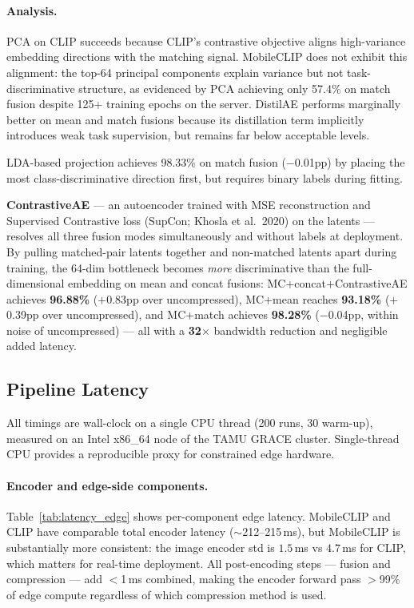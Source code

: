 \documentclass[10pt,twocolumn]{article}
\begin{document}
\paragraph{Analysis.}
PCA on CLIP succeeds because CLIP's contrastive objective aligns high-variance embedding
directions with the matching signal.
MobileCLIP does not exhibit this alignment: the top-64 principal components explain
variance but not task-discriminative structure, as evidenced by PCA achieving only
57.4\% on match fusion despite 125+ training epochs on the server.
DistilAE performs marginally better on mean and match fusions because its distillation
term implicitly introduces weak task supervision, but remains far below acceptable levels.

LDA-based projection achieves 98.33\% on match fusion ($-$0.01pp) by placing the
most class-discriminative direction first, but requires binary labels during fitting.

\textbf{ContrastiveAE} --- an autoencoder trained with MSE reconstruction and
Supervised Contrastive loss (SupCon; Khosla et al.\ 2020) on the latents --- resolves
all three fusion modes simultaneously and without labels at deployment.
By pulling matched-pair latents together and non-matched latents apart during training,
the 64-dim bottleneck becomes \emph{more} discriminative than the full-dimensional
embedding on mean and concat fusions: MC+concat+ContrastiveAE achieves \textbf{96.88\%}
($+$0.83pp over uncompressed), MC+mean reaches \textbf{93.18\%} ($+$0.39pp over uncompressed),
and MC+match achieves \textbf{98.28\%} ($-$0.04pp, within noise of uncompressed) ---
all with a \textbf{32$\times$} bandwidth reduction and negligible added latency.

\subsection{Pipeline Latency}

All timings are wall-clock on a single CPU thread (200 runs, 30 warm-up),
measured on an Intel x86\_64 node of the TAMU GRACE cluster.
Single-thread CPU provides a reproducible proxy for constrained edge hardware.

\paragraph{Encoder and edge-side components.}
Table~\ref{tab:latency_edge} shows per-component edge latency.
MobileCLIP and CLIP have comparable total encoder latency ($\sim$212--215\,ms),
but MobileCLIP is substantially more consistent: the image encoder
std is $1.5$\,ms vs $4.7$\,ms for CLIP, which matters for real-time deployment.
All post-encoding steps --- fusion and compression --- add $<$1\,ms combined,
making the encoder forward pass $>$99\% of edge compute regardless of which
compression method is used.
\end{document}
